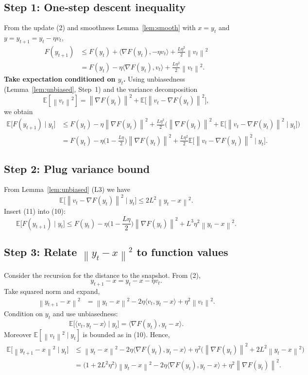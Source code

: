 \documentclass{article}
\newcommand{\EE}{\mathbb{E}}
\newcommand{\norm}[1]{\left\|#1\right\|}
\newcommand{\inner}[2]{\langle #1,#2\rangle}
\begin{document}
\subsection*{Step 1: One‑step descent inequality}
From the update (2) and smoothness Lemma~\ref{lem:smooth} with $x=y_t$ and $y=y_{t+1}=y_t-\eta v_t$,
\[
\begin{aligned}
F(y_{t+1})
&\le F(y_t)+\inner{\nabla F(y_t)}{-\eta v_t}
     +\frac{L\eta^{2}}{2}\norm{v_t}^{2}\\
&=F(y_t)-\eta\inner{\nabla F(y_t)}{v_t}
   +\frac{L\eta^{2}}{2}\norm{v_t}^{2}.
\end{aligned}
\tag{9}
\]
\textbf{Take expectation conditioned on $y_t$.}
Using unbiasedness (Lemma~\ref{lem:unbiased}, Step~1) and the variance decomposition
\[
\EE[\norm{v_t}^{2}]
   =\norm{\nabla F(y_t)}^{2}
     +\EE\!\big[\norm{v_t-\nabla F(y_t)}^{2}\big],
\]
we obtain
\[
\begin{aligned}
\EE\!\big[F(y_{t+1})\mid y_t\big]
&\le F(y_t)-\eta\norm{\nabla F(y_t)}^{2}
   +\frac{L\eta^{2}}{2}\Big(\norm{\nabla F(y_t)}^{2}
   +\EE\!\big[\norm{v_t-\nabla F(y_t)}^{2}\mid y_t\big]\Big)\\
&=F(y_t)-\eta\Big(1-\frac{L\eta}{2}\Big)\norm{\nabla F(y_t)}^{2}
   +\frac{L\eta^{2}}{2}\EE\!\big[\norm{v_t-\nabla F(y_t)}^{2}\mid y_t\big].
\end{aligned}
\tag{10}
\]

\subsection*{Step 2: Plug variance bound}
From Lemma~\ref{lem:unbiased} (L3) we have
\[
\EE\!\big[\norm{v_t-\nabla F(y_t)}^{2}\mid y_t\big]
   \le 2L^{2}\norm{y_t-x}^{2}.
\tag{11}
\]
Insert (11) into (10):
\[
\EE\!\big[F(y_{t+1})\mid y_t\big]
\le F(y_t)-\eta\Big(1-\frac{L\eta}{2}\Big)\norm{\nabla F(y_t)}^{2}
   +L^{3}\eta^{2}\norm{y_t-x}^{2}.
\tag{12}
\]

\subsection*{Step 3: Relate $\norm{y_t-x}^{2}$ to function values}
Consider the recursion for the distance to the snapshot.
From (2),
\[
y_{t+1}-x = y_t - x - \eta v_t .
\]
Take squared norm and expand,
\[
\begin{aligned}
\norm{y_{t+1}-x}^{2}
&= \norm{y_t-x}^{2}
   -2\eta\inner{v_t}{y_t-x}
   +\eta^{2}\norm{v_t}^{2}.
\end{aligned}
\tag{13}
\]
Condition on $y_t$ and use unbiasedness:
\[
\EE\!\big[\inner{v_t}{y_t-x}\mid y_t\big]
   =\inner{\nabla F(y_t)}{y_t-x}.
\]
Moreover $\EE[\norm{v_t}^{2}\mid y_t]$ is bounded as in (10). Hence,
\[
\begin{aligned}
\EE\!\big[\norm{y_{t+1}-x}^{2}\mid y_t\big]
&\le \norm{y_t-x}^{2}
   -2\eta\inner{\nabla F(y_t)}{y_t-x}
   +\eta^{2}\Big(\norm{\nabla F(y_t)}^{2}
   +2L^{2}\norm{y_t-x}^{2}\Big)\\
&= \big(1+2L^{2}\eta^{2}\big)\norm{y_t-x}^{2}
   -2\eta\inner{\nabla F(y_t)}{y_t-x}
   +\eta^{2}\norm{\nabla F(y_t)}^{2}.
\end{aligned}
\tag{14}
\]
\end{document}
